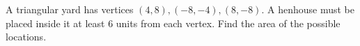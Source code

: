 A triangular yard has vertices $(4,8),(-8,-4),(8,-8)$. A henhouse must be placed inside it at least $6$ units from each vertex. Find the area of the possible locations.
